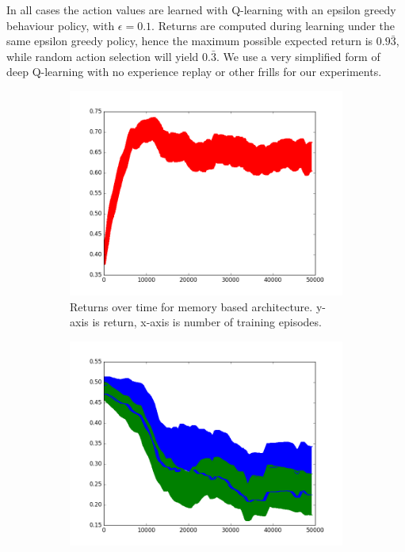 \documentclass{article}
\begin{document}
In all cases the action values are learned with Q-learning with an epsilon greedy behaviour policy, with $\epsilon=0.1$. Returns are computed during learning under the same epsilon greedy policy, hence the maximum possible expected return is $0.9\bar{3}$, while random action selection will yield $0.\bar{3}$. We use a very simplified form of deep Q-learning \cite{DQN} with no experience replay or other frills for our experiments.
\begin{figure}[!ht]
\centering
\begin{subfigure}[t]{.45\textwidth}
  \centering
      \includegraphics[width=1\textwidth]{images/1_query_mem_ret.png}
  \caption{Returns over time for memory based architecture. y-axis is return, x-axis is number of training episodes.}
  \label{fig:1_query_ret}
\end{subfigure}\hfill
\begin{subfigure}[t]{.45\textwidth}
  \centering
      \includegraphics[width=1\textwidth]{images/1_query_mem_writes.png}

\end{subfigure}
\end{figure}
\end{document}
